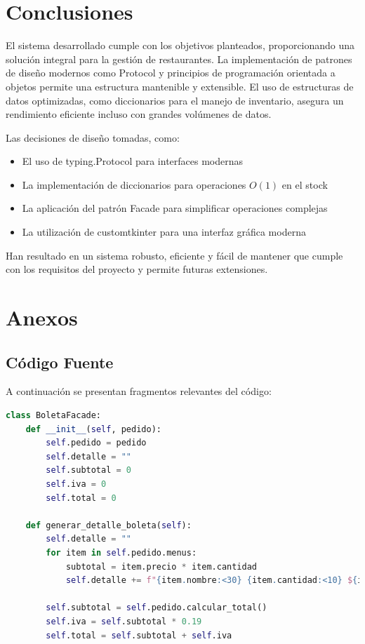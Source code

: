 \documentclass[12pt,letterpaper]{article}
\begin{document}
\section{Conclusiones}
El sistema desarrollado cumple con los objetivos planteados, proporcionando una solución integral para la gestión de restaurantes. La implementación de patrones de diseño modernos como Protocol y principios de programación orientada a objetos permite una estructura mantenible y extensible. El uso de estructuras de datos optimizadas, como diccionarios para el manejo de inventario, asegura un rendimiento eficiente incluso con grandes volúmenes de datos.

Las decisiones de diseño tomadas, como:
\begin{itemize}
    \item El uso de typing.Protocol para interfaces modernas
    \item La implementación de diccionarios para operaciones $O(1)$ en el stock
    \item La aplicación del patrón Facade para simplificar operaciones complejas
    \item La utilización de customtkinter para una interfaz gráfica moderna
\end{itemize}

Han resultado en un sistema robusto, eficiente y fácil de mantener que cumple con los requisitos del proyecto y permite futuras extensiones.

\section{Anexos}
\subsection{Código Fuente}
A continuación se presentan fragmentos relevantes del código:

\begin{lstlisting}[language=Python, caption=Implementación de BoletaFacade]
class BoletaFacade:
    def __init__(self, pedido):
        self.pedido = pedido
        self.detalle = ""
        self.subtotal = 0
        self.iva = 0
        self.total = 0

    def generar_detalle_boleta(self):
        self.detalle = ""
        for item in self.pedido.menus:
            subtotal = item.precio * item.cantidad
            self.detalle += f"{item.nombre:<30} {item.cantidad:<10} ${item.precio:<10.2f} ${subtotal:<10.2f}\n"
        
        self.subtotal = self.pedido.calcular_total()
        self.iva = self.subtotal * 0.19
        self.total = self.subtotal + self.iva
\end{lstlisting}
\end{document}
